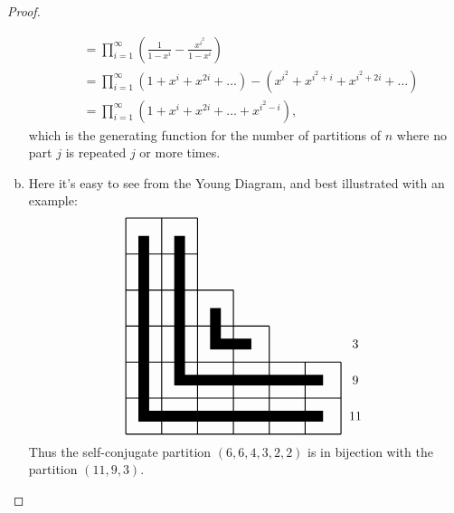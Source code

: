 \documentclass{article}
\newenvironment{problem}[2][Problem]{\begin{trivlist}
\item[\hskip \labelsep {\bfseries #1}\hskip \labelsep {\bfseries #2.}]}{\end{trivlist}}
\newcommand{\paren}[1]{\left( #1 \right)}
\begin{document}
\begin{proof}
\begin{enumerate}[(a)]
\begin{align*}
      &= \prod_{i=1}^\infty \paren{\frac{1}{1-x^i} - \frac{x^{i^2}}{1-x^i}} \\
      &= \prod_{i=1}^\infty (1 + x^i + x^{2i} + \hdots) - (x^{i^2} + x^{i^2 + i} + x^{i^2 + 2i} + \hdots) \\
      &= \prod_{i=1}^\infty (1 + x^i + x^{2i} + \hdots + x^{i^2 - i}),
    \end{align*}
    which is the generating function for the number of partitions of $n$ where
    no part $j$ is repeated $j$ or more times.
    \item Here it's easy to see from the Young Diagram, and best illustrated
    with an example: \[
      \begin{tikzpicture}
        \draw[thick]
          (0,0) grid (6,1)
          (0,0) grid (1,6)
          (1,1) grid (2,6)
          (1,1) grid (6,2)
          (2,2) grid (4,3)
          (2,2) grid (3,4)
        ;
        \draw[line width=0.3cm]
          (5.5,0.5)--(0.5,0.5)--(0.5,5.5)
          (5.5,1.5)--(1.5,1.5)--(1.5,5.5)
          (3.5,2.5)--(2.5,2.5)--(2.5,3.5)
        ;
        \node at (6.4,0.5) {11};
        \node at (6.4,1.5) {9};
        \node at (6.4,2.5) {3};
      \end{tikzpicture}
    \] Thus the self-conjugate partition $(6,6,4,3,2,2)$ is in bijection with
    the partition $(11,9,3)$.
  \end{enumerate}
\end{proof}
\pagebreak
\begin{problem}{2}
\end{problem}
\end{document}
